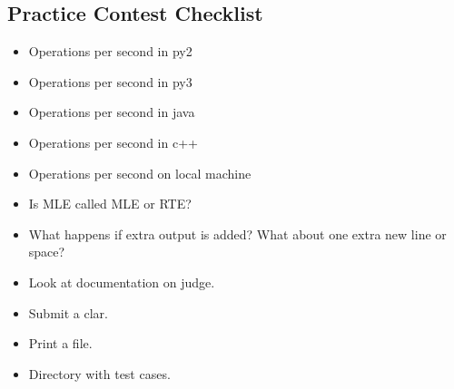 \documentclass[8pt,a4paper,landscape,oneside]{amsart}
\begin{document}
\begin{multicols*}{2}
\begin{large}
\section{Practice Contest Checklist}
\begin{itemize}
    \item Operations per second in py2
    \item Operations per second in py3
    \item Operations per second in java
    \item Operations per second in c++
    \item Operations per second on local machine
    \item Is MLE called MLE or RTE?
    \item What happens if extra output is added? What about one extra new line or space?
    \item Look at documentation on judge.
    \item Submit a clar.
    \item Print a file.
    \item Directory with test cases.
\end{itemize}


\end{large}
\end{multicols*}
\end{document}
